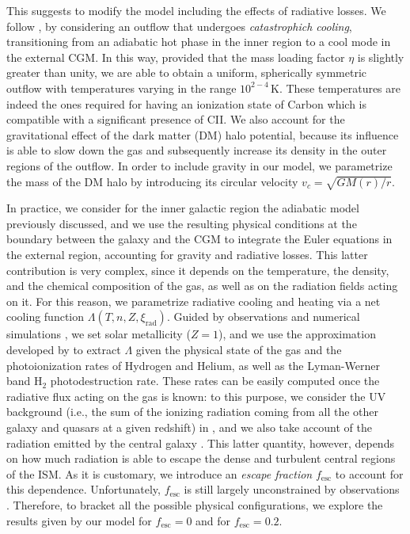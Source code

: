 \documentclass[12pt]{article}
\begin{document}
This suggests to modify the model including the effects of radiative losses. We follow \citet{Thompson16}, by considering an outflow that undergoes \textit{catastrophich cooling}, transitioning from an adiabatic hot phase in the inner region to a cool mode in the external CGM. In this way, provided that the mass loading factor $\eta$ is slightly greater than unity, we are able to obtain a uniform, spherically symmetric outflow with temperatures varying in the range $10^{2-4}\,\mathrm{K}$. These temperatures are indeed the ones required for having an ionization state of Carbon which is compatible with a significant presence of CII. We also account for the gravitational effect of the dark matter (DM) halo potential, because its influence is able to slow down the gas and subsequently increase its density in the outer regions of the outflow. In order to include gravity in our model, we parametrize the mass of the DM halo by introducing its circular velocity $v_c=\sqrt{GM(r)/r}$.

In practice, we consider for the inner galactic region the adiabatic model previously discussed, and we use the resulting physical conditions at the boundary between the galaxy and the CGM to integrate the Euler equations in the external region, accounting for gravity and radiative losses. This latter contribution is very complex, since it depends on the temperature, the density, and the chemical composition of the gas, as well as on the radiation fields acting on it. For this reason, we parametrize radiative cooling and heating via a net cooling function $\Lambda(T,n,Z, \xi_\mathrm{rad})$. Guided by observations and numerical simulations \citep{mannucci:2012, pallottini2017b}, we set solar metallicity ($Z=1$), and we use the approximation developed by \citet{gnedin2012cooling} to extract $\Lambda$ given the physical state of the gas and the photoionization rates of Hydrogen and Helium, as well as the Lyman-Werner band $\mathrm{H}_2$ photodestruction rate. These rates can be easily computed once the radiative flux acting on the gas is known: to this purpose, we consider the UV background (i.e., the sum of the ionizing radiation coming from all the other galaxy and quasars at a given redshift) in \citet{haardt2012radiative}, and we also take account of the radiation emitted by the central galaxy \citep{leitherer1999}. This latter quantity, however, depends on how much radiation is able to escape the dense and turbulent central regions of the ISM. As it is customary, we introduce an \textit{escape fraction} $f_\mathrm{esc}$ to account for this dependence. Unfortunately, $f_\mathrm{esc}$ is still largely unconstrained by observations \citep{Dayal:2018hft}. Therefore, to bracket all the possible physical configurations, we explore the results given by our model for $f_\mathrm{esc}=0$ and for $f_\mathrm{esc}=0.2$.
\end{document}
